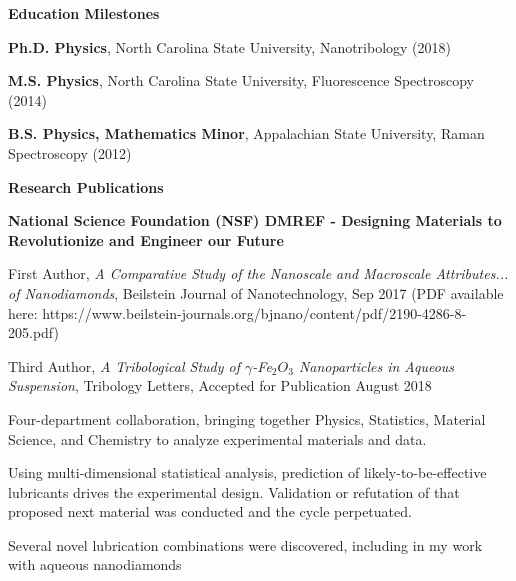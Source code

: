 \documentclass[letterpaper,final]{memoir}
\newcommand{\Sep}{\vspace{1.0em}}
\newcommand{\SmallSep}{\vspace{0.4em}}
\newcommand{\CVSection}[1]
	{\LARGE\textbf{#1}\par
	\SmallSep\normalsize}
\newcommand{\CVItem}[1]
	{\textbf{\color{Blue} #1}}
\begin{document}

\notoserif \CVSection{Education Milestones}
\normalfont
\Sep
\begin{compactitem}[\color{Blue}$\circ$]

\item \textbf{Ph.D. Physics}, North Carolina State University, Nanotribology (2018)
\SmallSep
\item \textbf{M.S. Physics}, North Carolina State University, Fluorescence Spectroscopy (2014)
\SmallSep
\item \textbf{B.S. Physics, Mathematics Minor}, Appalachian State University, Raman Spectroscopy (2012)

\end{compactitem}
\Sep



\notoserif \CVSection{Research Publications}
\normalfont

\SmallSep
\CVItem{National Science Foundation (NSF) DMREF - Designing Materials to Revolutionize and Engineer our Future} 
\SmallSep

\begin{compactitem}[\color{Blue}$\circ$]
	 
    \item First Author, \textit{A Comparative Study of the Nanoscale and Macroscale Attributes... of Nanodiamonds}, Beilstein Journal of Nanotechnology, Sep 2017 (PDF available here: https://www.beilstein-journals.org/bjnano/content/pdf/2190-4286-8-205.pdf)
    \SmallSep

\item Third Author, \textit{A Tribological Study of $\gamma$-Fe$_{2}O_{3}$ Nanoparticles in Aqueous Suspension}, Tribology Letters, Accepted for Publication August 2018
    \SmallSep

    \item Four-department collaboration, bringing together Physics, Statistics, Material Science, and Chemistry to analyze experimental
            materials and data. 
    \SmallSep

    \item Using multi-dimensional statistical analysis, prediction of likely-to-be-effective lubricants drives the experimental design.
            Validation or refutation of that proposed next material was conducted and the cycle perpetuated. 
    \SmallSep
            
    \item Several novel lubrication combinations were discovered, including in my
            work with aqueous nanodiamonds
	
\end{compactitem}
\end{document}
